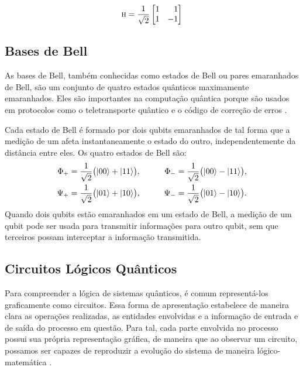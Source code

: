\begin{equation}
\HAD= \frac{1}{\sqrt{2}} \begin{bmatrix*}[r]
1 & 1 \\
1 & -1
\end{bmatrix*}
\end{equation}

\subsection{Bases de Bell}\label{sec:bell}
As bases de Bell, também conhecidas como estados de Bell ou pares emaranhados de Bell, são um conjunto de quatro estados quânticos maximamente emaranhados. Eles são importantes na computação quântica porque são usados em protocolos como o teletransporte quântico e o código de correção de erros \cite{Bell}.

Cada estado de Bell é formado por dois qubits emaranhados de tal forma que a medição de um afeta instantaneamente o estado do outro, independentemente da distância entre eles. Os quatro estados de Bell são:
\begin{equation}
  \begin{aligned}
    \Phi_+ &= \frac{1}{\sqrt{2}} \bigl(\ket{00} + \ket{11} \bigr), & \qquad \Phi_- &= \frac{1}{\sqrt{2}} \bigl(\ket{00} - \ket{11} \bigr), \\
    \Psi_+ &= \frac{1}{\sqrt{2}} \bigl(\ket{01} + \ket{10} \bigr), & \qquad \Psi_- &= \frac{1}{\sqrt{2}} \bigl(\ket{01} - \ket{10} \bigr). \\
  \end{aligned}
\end{equation}
Quando dois qubits estão emaranhados em um estado de Bell, a medição de um qubit pode ser usada para transmitir informações para outro qubit, sem que terceiros possam interceptar a informação transmitida.

\subsection{Circuitos Lógicos Quânticos}\label{sec:circuitos}

Para compreender a lógica de sistemas quânticos, é comum representá-los graficamente como circuitos. Essa forma de apresentação estabelece de maneira clara as operações realizadas, as entidades envolvidas e a informação de entrada e de saída do processo em questão. Para tal, cada parte envolvida no processo possui sua própria representação gráfica, de maneira que ao observar um circuito, possamos ser capazes de reproduzir a evolução do sistema de maneira lógico-matemática \cite{chuang}.

